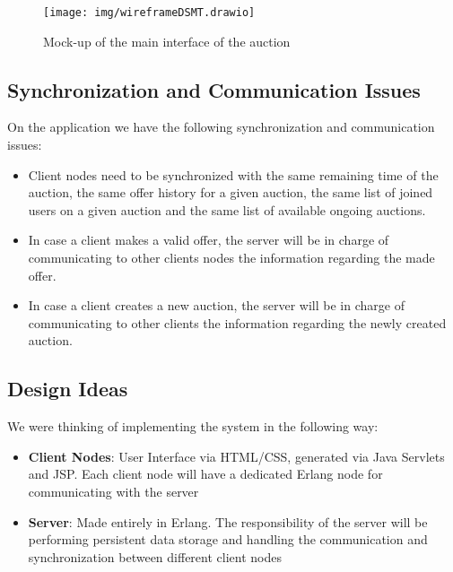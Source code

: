 \begin{figure}[H]
	\centering
	\texttt{[image: img/wireframeDSMT.drawio]}
	\caption{Mock-up of the main interface of the auction}
	\label{fig:wireframedsmt}
\end{figure}

\subsection{Synchronization and Communication Issues}
On the application we have the following synchronization and communication issues:
\begin{itemize}
	\item Client nodes need to be synchronized with the same remaining time of the auction, the same offer history for a given auction, the same list of joined users on a given auction and the same list of available ongoing auctions.
	\item In case a client makes a valid offer, the server will be in charge of  communicating to other clients nodes the information regarding the made offer. 
	\item In case a client creates a new auction, the server will be in charge of communicating to other clients the information regarding the newly created auction.
\end{itemize}


\subsection{Design Ideas}
We were thinking of implementing the system in the following way:
\begin{itemize}
	\item \textbf{Client Nodes}: User Interface via HTML/CSS, generated via Java Servlets and JSP. Each client node will have a dedicated Erlang node for communicating with the server
	\item \textbf{Server}: Made entirely in Erlang. The responsibility of the server will be performing persistent data storage and handling the communication and synchronization between different client nodes
\end{itemize}